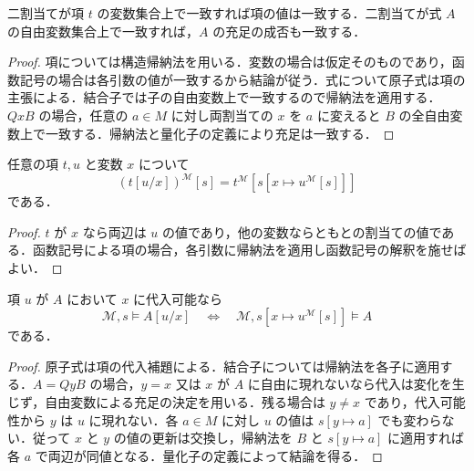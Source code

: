 \begin{prop}[自由変数による充足の決定]
二割当てが項 $t$ の変数集合上で一致すれば項の値は一致する．二割当てが式 $A$ の自由変数集合上で一致すれば，$A$ の充足の成否も一致する．
\end{prop}
\begin{proof}
項については構造帰納法を用いる．変数の場合は仮定そのものであり，函数記号の場合は各引数の値が一致するから結論が従う．式について原子式は項の主張による．結合子では子の自由変数上で一致するので帰納法を適用する．$QxB$ の場合，任意の $a\in M$ に対し両割当ての $x$ を $a$ に変えると $B$ の全自由変数上で一致する．帰納法と量化子の定義により充足は一致する．
\end{proof}
\begin{prop}[項の代入補題]
任意の項 $t,u$ と変数 $x$ について
\[
(t[u/x])^{\mathcal M}[s]=t^{\mathcal M}[s[x\mapsto u^{\mathcal M}[s]]]
\]
である．
\end{prop}
\begin{proof}
$t$ が $x$ なら両辺は $u$ の値であり，他の変数ならともとの割当ての値である．函数記号による項の場合，各引数に帰納法を適用し函数記号の解釈を施せばよい．
\end{proof}
\begin{prop}[論理式の代入補題]
項 $u$ が $A$ において $x$ に代入可能なら
\[
\mathcal M,s\models A[u/x]\quad\Longleftrightarrow\quad
\mathcal M,s[x\mapsto u^{\mathcal M}[s]]\models A
\]
である．
\end{prop}
\begin{proof}
原子式は項の代入補題による．結合子については帰納法を各子に適用する．$A=QyB$ の場合，$y=x$ 又は $x$ が $A$ に自由に現れないなら代入は変化を生じず，自由変数による充足の決定を用いる．残る場合は $y\ne x$ であり，代入可能性から $y$ は $u$ に現れない．各 $a\in M$ に対し $u$ の値は $s[y\mapsto a]$ でも変わらない．従って $x$ と $y$ の値の更新は交換し，帰納法を $B$ と $s[y\mapsto a]$ に適用すれば各 $a$ で両辺が同値となる．量化子の定義によって結論を得る．
\end{proof}
